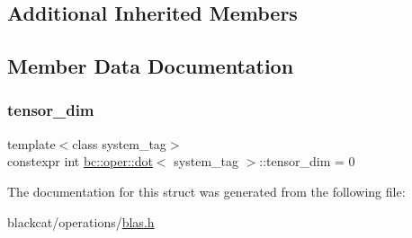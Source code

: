 \subsection*{Additional Inherited Members}


\subsection{Member Data Documentation}
\mbox{\label{structbc_1_1oper_1_1dot_aedafe970f0b974b7ef44c445bca5d710}} 
\subsubsection{\texorpdfstring{tensor\+\_\+dim}{tensor\_dim}}
{\footnotesize\ttfamily template$<$class system\+\_\+tag$>$ \\
constexpr int \hyperlink{structbc_1_1oper_1_1dot}{bc\+::oper\+::dot}$<$ system\+\_\+tag $>$\+::tensor\+\_\+dim = 0\hspace{0.3cm}{\ttfamily [static]}}



The documentation for this struct was generated from the following file\+:\begin{DoxyCompactItemize}
\item 
blackcat/operations/\hyperlink{operations_2blas_8h}{blas.\+h}\end{DoxyCompactItemize}
